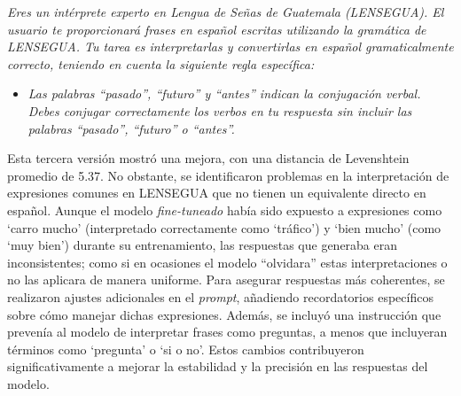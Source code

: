 \vspace{0.5cm}
\begin{tcolorbox}[colback=gray!10, colframe=black, title=Prompt (versión 3)] 
\textit{Eres un intérprete experto en Lengua de Señas de Guatemala (LENSEGUA). El usuario te proporcionará frases en español escritas utilizando la gramática de LENSEGUA. Tu tarea es interpretarlas y convertirlas en español gramaticalmente correcto, teniendo en cuenta la siguiente regla específica:} 
\begin{itemize} 
    \item \textit{Las palabras “pasado”, “futuro” y “antes” indican la conjugación verbal. Debes conjugar correctamente los verbos en tu respuesta sin incluir las palabras “pasado”, “futuro” o “antes”.} 
\end{itemize} 
\end{tcolorbox}
\vspace{0.5cm}

Esta tercera versión mostró una mejora, con una distancia de Levenshtein promedio de 5.37. No obstante, se identificaron problemas en la interpretación de expresiones comunes en LENSEGUA que no tienen un equivalente directo en español. Aunque el modelo \textit{fine-tuneado} había sido expuesto a expresiones como ‘carro mucho’ (interpretado correctamente como ‘tráfico’) y ‘bien mucho’ (como ‘muy bien’) durante su entrenamiento, las respuestas que generaba eran inconsistentes; como si en ocasiones el modelo “olvidara” estas interpretaciones o no las aplicara de manera uniforme. Para asegurar respuestas más coherentes, se realizaron ajustes adicionales en el \textit{prompt}, añadiendo recordatorios específicos sobre cómo manejar dichas expresiones. Además, se incluyó una instrucción que prevenía al modelo de interpretar frases como preguntas, a menos que incluyeran términos como ‘pregunta’ o ‘si o no’. Estos cambios contribuyeron significativamente a mejorar la estabilidad y la precisión en las respuestas del modelo.

